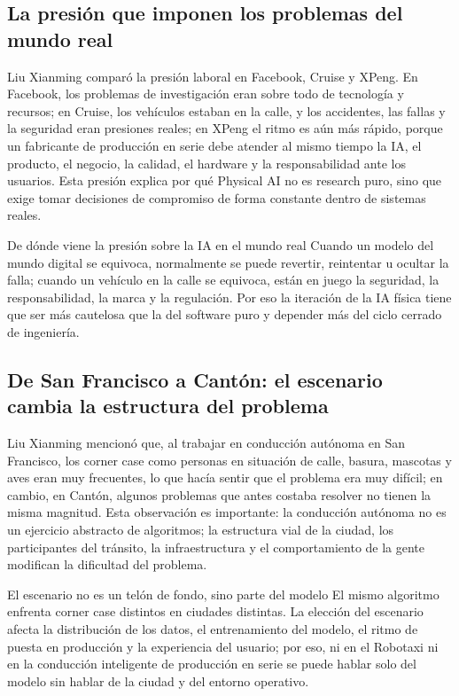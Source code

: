 \subsection{La presión que imponen los problemas del mundo real}

Liu Xianming comparó la presión laboral en Facebook, Cruise y XPeng. En Facebook, los problemas de investigación eran sobre todo de tecnología y recursos; en Cruise, los vehículos estaban en la calle, y los accidentes, las fallas y la seguridad eran presiones reales; en XPeng el ritmo es aún más rápido, porque un fabricante de producción en serie debe atender al mismo tiempo la IA, el producto, el negocio, la calidad, el hardware y la responsabilidad ante los usuarios. Esta presión explica por qué Physical AI no es research puro, sino que exige tomar decisiones de compromiso de forma constante dentro de sistemas reales.

\begin{warningbox}{De dónde viene la presión sobre la IA en el mundo real}
Cuando un modelo del mundo digital se equivoca, normalmente se puede revertir, reintentar u ocultar la falla; cuando un vehículo en la calle se equivoca, están en juego la seguridad, la responsabilidad, la marca y la regulación. Por eso la iteración de la IA física tiene que ser más cautelosa que la del software puro y depender más del ciclo cerrado de ingeniería.
\end{warningbox}

\subsection{De San Francisco a Cantón: el escenario cambia la estructura del problema}

Liu Xianming mencionó que, al trabajar en conducción autónoma en San Francisco, los corner case como personas en situación de calle, basura, mascotas y aves eran muy frecuentes, lo que hacía sentir que el problema era muy difícil; en cambio, en Cantón, algunos problemas que antes costaba resolver no tienen la misma magnitud. Esta observación es importante: la conducción autónoma no es un ejercicio abstracto de algoritmos; la estructura vial de la ciudad, los participantes del tránsito, la infraestructura y el comportamiento de la gente modifican la dificultad del problema.

\begin{importantbox}{El escenario no es un telón de fondo, sino parte del modelo}
El mismo algoritmo enfrenta corner case distintos en ciudades distintas. La elección del escenario afecta la distribución de los datos, el entrenamiento del modelo, el ritmo de puesta en producción y la experiencia del usuario; por eso, ni en el Robotaxi ni en la conducción inteligente de producción en serie se puede hablar solo del modelo sin hablar de la ciudad y del entorno operativo.
\end{importantbox}

